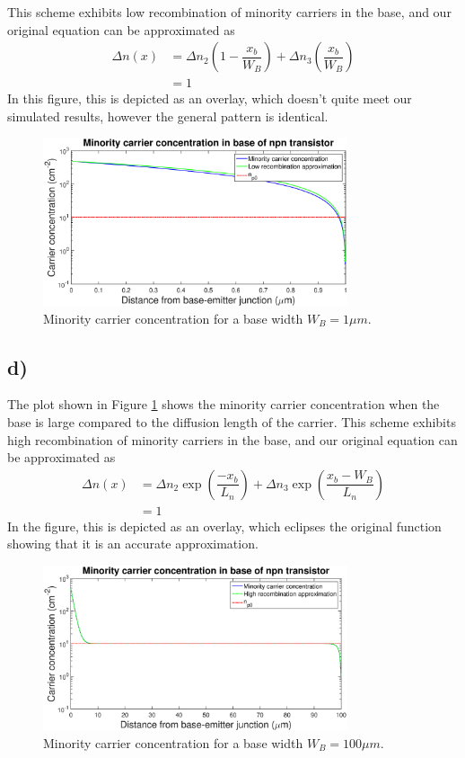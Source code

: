 	This scheme exhibits low recombination of minority carriers in the base, and our original equation can be approximated as
	\[
	\begin{aligned}
		\Delta n(x) &= \Delta n_2 \left(1 - \dfrac{x_b}{W_B}\right) +
		\Delta n_3 \left(\dfrac{x_b}{W_B}\right) \\
					&= 1
	\end{aligned}
	\]
	In this figure, this is depicted as an overlay, which doesn't quite meet our simulated results, however the general pattern is identical.
	
	\begin{figure}[htbp!]
		\centering
		\includegraphics[width=0.8\textwidth]{./img/3c}
		\caption{Minority carrier concentration for a base width $W_B = 1 \mu m$.}
		\label{fig::3c}
	\end{figure}
\subsection*{d)}
	The plot shown in Figure \ref{fig::3c} shows the minority carrier concentration when the base is large compared to the diffusion length of the carrier. This scheme exhibits high recombination of minority carriers in the base, and our original equation can be approximated as
	\[
	\begin{aligned}
		\Delta n(x) &= \Delta n_2 \exp\left(\dfrac{-x_b}{L_n}\right) +					\Delta n_3 \exp\left(\dfrac{x_b-W_B}{L_n}\right) \\
					&= 1
	\end{aligned}
	\]
	In the figure, this is depicted as an overlay, which eclipses the original function showing that it is an accurate approximation.
	\begin{figure}[htbp!]
		\centering
		\includegraphics[width=0.8\textwidth]{./img/3d}
		\caption{Minority carrier concentration for a base width $W_B = 100 \mu m$.}
		\label{fig::3d}
	\end{figure}

